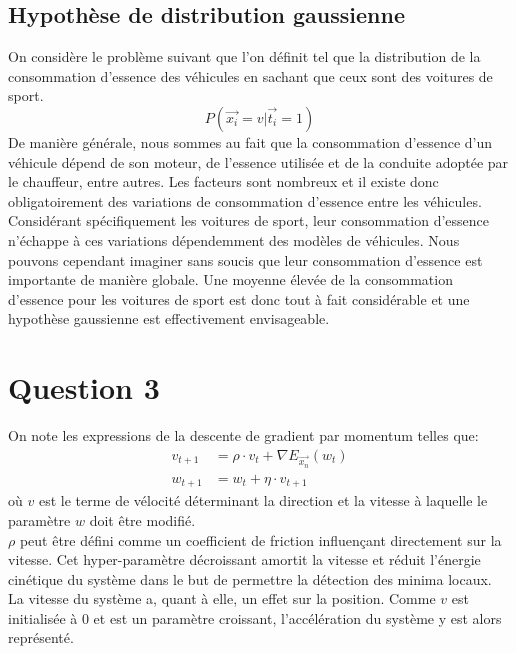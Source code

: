 \subsection{Hypothèse de distribution gaussienne}
On considère le problème suivant que l'on définit tel que la distribution de la consommation d'essence des véhicules en sachant que ceux sont des voitures de sport.
$$ P(\overrightarrow{x_i} = v | \overrightarrow{t_i} = 1) $$
De manière générale, nous sommes au fait que la consommation d'essence d'un véhicule dépend de son moteur, de l'essence utilisée et de la conduite adoptée par le chauffeur, entre autres. Les facteurs sont nombreux et il existe donc obligatoirement des variations de consommation d'essence entre les véhicules. Considérant spécifiquement les voitures de sport, leur consommation d'essence n'échappe à ces variations dépendemment des modèles de véhicules. Nous pouvons cependant imaginer sans soucis que leur consommation d'essence est importante de manière globale. Une moyenne élevée de la consommation d'essence pour les voitures de sport est donc tout à fait considérable et une hypothèse gaussienne est effectivement envisageable.

\section{Question 3}
On note les expressions de la descente de gradient par momentum telles que:
\begin{equation}
\begin{split}
	v_{t+1} &= \rho \cdot v_t +  \nabla E_{\overrightarrow{x_n}} (w_t) \\
	w_{t+1} &= w_t + \eta \cdot v_{t+1}
\end{split}
\end{equation}
où $v$ est le terme de vélocité déterminant la direction et la vitesse à laquelle le paramètre $w$ doit être modifié. \\
$\rho$ peut être défini comme un coefficient de friction influençant directement sur la vitesse. Cet hyper-paramètre décroissant amortit la vitesse et réduit l'énergie cinétique du système dans le but de permettre la détection des minima locaux. \\
La vitesse du système a, quant à elle, un effet sur la position. Comme $v$ est initialisée à 0 et est un paramètre croissant, l'accélération du système y est alors représenté.
